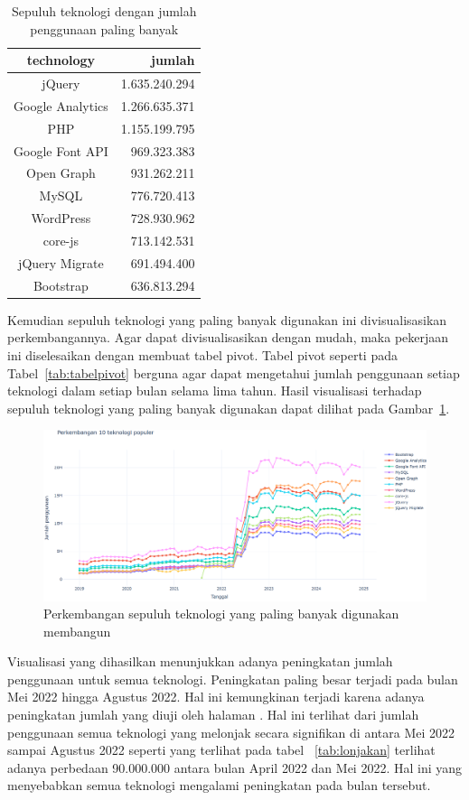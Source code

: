 \begin{table}[H]
\centering
\caption{Sepuluh teknologi dengan jumlah penggunaan paling banyak}
\label{tab:sepuluhteknologipopulerreal}
\begin{tabular}{|c|r|}
\hline
technology & jumlah \\ \hline
jQuery & 1.635.240.294 \\ \hline
Google Analytics & 1.266.635.371 \\ \hline
PHP & 1.155.199.795 \\ \hline
Google Font API & 969.323.383 \\ \hline
Open Graph & 931.262.211 \\ \hline
MySQL & 776.720.413 \\ \hline
WordPress & 728.930.962 \\ \hline
core-js & 713.142.531 \\ \hline
jQuery Migrate & 691.494.400 \\ \hline
Bootstrap & 636.813.294 \\ \hline
\end{tabular}
\end{table}

Kemudian sepuluh teknologi yang paling banyak digunakan ini divisualisasikan perkembangannya. Agar dapat divisualisasikan dengan mudah, maka pekerjaan ini diselesaikan dengan membuat tabel pivot. Tabel pivot seperti pada Tabel~\ref{tab:tabelpivot} berguna agar dapat mengetahui jumlah penggunaan setiap teknologi dalam setiap bulan selama lima tahun. Hasil visualisasi terhadap sepuluh teknologi yang paling banyak digunakan dapat dilihat pada Gambar~\ref{fig:sepuluhteknologireal}.
\begin{figure}[H]
    \centering
    \includegraphics[width=0.7\linewidth]{Gambar/Perkembangan sepuluh real.png}
    \caption{Perkembangan sepuluh teknologi yang paling banyak digunakan membangun \web}
    \label{fig:sepuluhteknologireal}
\end{figure}

Visualisasi yang dihasilkan menunjukkan adanya peningkatan jumlah penggunaan untuk semua teknologi. Peningkatan paling besar terjadi pada bulan Mei 2022 hingga Agustus 2022. Hal ini kemungkinan terjadi karena adanya peningkatan jumlah \web yang diuji oleh halaman \http. Hal ini terlihat dari jumlah penggunaan semua teknologi yang melonjak secara signifikan di antara Mei 2022 sampai Agustus 2022 seperti yang terlihat pada tabel ~\ref{tab:lonjakan} terlihat adanya perbedaan 90.000.000 antara bulan April 2022 dan Mei 2022. Hal ini yang menyebabkan semua teknologi mengalami peningkatan pada bulan tersebut.

